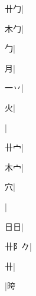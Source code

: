 \begin{multicols}{2}
{{\cjk{}{\cnsym{}　}卄勹}|{}\par
{\cjk{}{\cnsym{}　}木勹}|{}\par
{勹}|{}\par
{\cjk{}{\cnsym{}　}{\cnsym{}　}月}|{}\par
{一丷}|{}\par
{\cjk{}{\cnsym{}　}{\cnsym{}　}火}|{}\par
{}|{}\par
{\cjk{}{\cnsym{}　}卄{宀}}|{}\par
{\cjk{}{\cnsym{}　}木{宀}}|{}\par
{\cjk{}{\cnsym{}　}{\cnsym{}　}穴}|{}\par
{}|{}\par
{\cjk{}{\cnsym{}　}日日}|{}\par
{\cjk{}卄{阝}{\cnxb{}𠂊}}|{}\par
{\cjk{}{\cnsym{}　}{\cnsym{}　}卄}|{}\par
{\cjk{}{\cnsym{}　}{\cnsym{}　}{\cnsym{}　}}|{\cjk{}晇}\par
}
\end{multicols}
